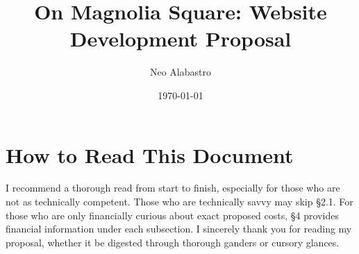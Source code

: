 \documentclass{article}
\begin{document}
\author{Neo Alabastro}
\title{On Magnolia Square: Website Development Proposal}
\date{\today}

\maketitle

\newpage

\renewcommand\contentsname{Summary}
\setcounter{tocdepth}{2}
\tableofcontents

\newpage

\section*{How to Read This Document}
I recommend a thorough read from start to finish, especially for those who are not as technically competent. Those who are technically savvy may skip §2.1. For those who are only financially curious about exact proposed costs, §4 provides financial information under each subsection. I sincerely thank you for reading my proposal, whether it be digested through thorough ganders or cursory glances.

\newpage



\newpage



\newpage





\newpage



\newpage



% 
\end{document}
